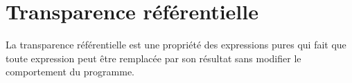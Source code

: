 \section{Transparence référentielle}
\label{referential-transparency}

La transparence référentielle est une propriété des expressions pures qui fait que toute expression peut être remplacée par son résultat sans modifier le comportement du programme.
